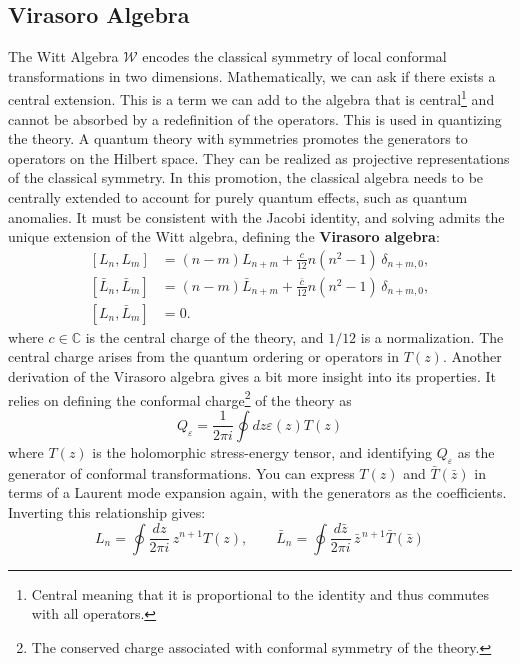 \documentclass{article}
\begin{document}
\subsection{Virasoro Algebra}
The Witt Algebra $\mathcal{W}$ encodes the classical symmetry of local conformal transformations in two dimensions. Mathematically, we can ask if there exists a central extension. This is a term we can add to the algebra that is central\footnote{Central meaning that it is proportional to the identity and thus commutes with all operators.} and cannot be absorbed by a redefinition of the operators. This is used in quantizing the theory. A quantum theory with symmetries promotes the generators to operators on the Hilbert space. They can be realized as projective representations of the classical symmetry. In this promotion, the classical algebra needs to be centrally extended to account for purely quantum effects, such as quantum anomalies. It must be consistent with the Jacobi identity, and solving admits the unique extension of the Witt algebra, defining the \textbf{Virasoro algebra}: 
\begin{equation}
\boxed{
\begin{aligned}
[L_n, L_m] &= (n-m)L_{n+m} + \frac{c}{12}n(n^2-1)\,\delta_{n+m,0}, \\
[\bar{L}_n, \bar{L}_m] &= (n-m)\bar{L}_{n+m} + \frac{\bar{c}}{12}n(n^2-1)\,\delta_{n+m,0}, \\
[L_n, \bar{L}_m] &= 0.
\end{aligned}
}
\end{equation}
where $c \in \mathds{C}$ is the central charge of the theory, and $1/12$ is a normalization. The central charge arises from the quantum ordering or operators in $T(z)$. Another derivation of the Virasoro algebra gives a bit more insight into its properties. It relies on defining the conformal charge\footnote{The conserved charge associated with conformal symmetry of the theory.} of the theory as 
\begin{equation}
    Q_\varepsilon = \frac{1}{2\pi i }\oint dz \varepsilon(z)T(z)
\end{equation}
where $T(z)$ is the holomorphic stress-energy tensor, and identifying $Q_\varepsilon$ as the generator of conformal transformations. You can express $T(z)$ and $\bar{T}(\bar{z})$ in terms of a Laurent mode expansion again, with the generators as the coefficients. Inverting this relationship gives: 
\begin{equation}
\boxed{
L_n = \oint \frac{dz}{2\pi i}\, z^{n+1} T(z),
\qquad
\bar{L}_n = \oint \frac{d\bar z}{2\pi i}\, \bar z^{\,n+1} \bar T(\bar z)
}
\end{equation}
\end{document}
